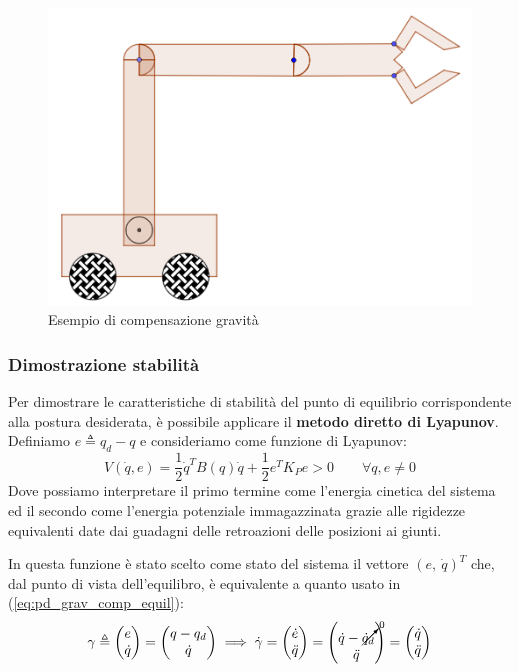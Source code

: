 \begin{figure}[H]
	\centering
	\includegraphics[width=0.5\linewidth]{images/centralized_control_pd_gravity_comp_example}
	\caption{Esempio di compensazione gravità}
	\label{fig:centralizedcontrolpdgravitycompexample}
\end{figure}




\vspace{20pt}
\subsubsection{Dimostrazione stabilità}
\boldmath
Per dimostrare le caratteristiche di stabilità del punto di equilibrio corrispondente alla postura desiderata, è possibile applicare il \textbf{metodo diretto di Lyapunov}. Definiamo $e \triangleq q_d - q$ e consideriamo come funzione di Lyapunov:
$$
V(\dot{q}, e) = \frac{1}{2}\dot{q}^TB(q)\dot{q} + \frac{1}{2}e^TK_Pe > 0    \qquad \forall q,e\neq0
$$
Dove possiamo interpretare il primo termine come l’energia cinetica del sistema ed il secondo come l’energia potenziale immagazzinata grazie alle rigidezze equivalenti date dai guadagni delle retroazioni delle posizioni ai giunti.

In questa funzione è stato scelto come stato del sistema il vettore $(e, \ \dot{q})^T$ che, dal punto di vista dell'equilibro, è equivalente a quanto usato in (\ref{eq:pd_grav_comp_equil}):
\begin{gather*}
\gamma \triangleq \begin{pmatrix}e \\ \dot{q}\end{pmatrix} = \begin{pmatrix}q - q_d \\ \dot{q}\end{pmatrix}
\implies 
\dot{\gamma} = \begin{pmatrix}\dot{e} \\ \ddot{q}\end{pmatrix} = \begin{pmatrix}\dot{q} - \cancelto{0}{\dot{q}_d} \\ \ddot{q}\end{pmatrix} = \begin{pmatrix}\dot{q} \\ \ddot{q}\end{pmatrix}
\end{gather*}



